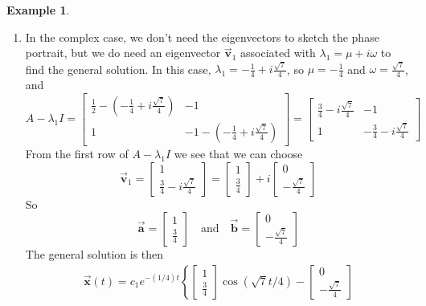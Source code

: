 \documentclass[reqno]{immbook}
\newcommand{\BA}{\vec{\textbf{a}}}
\newcommand{\BB}{\vec{\textbf{b}}}
\newcommand{\BV}{\vec{\textbf{v}}}
\newcommand{\BX}{\vec{\textbf{x}}}
\numberwithin{equation}{chapter}
\numberwithin{question}{section}
\numberwithin{theorem}{chapter}
\numberwithin{figure}{chapter}
\theoremstyle{definition}
\newtheorem{example}{Example}[section]
\begin{document}
\begin{example}
\begin{enumerate}
\item In the complex case, we don't need the eigenvectors
to sketch the phase portrait, but we do need an eigenvector
$\BV_1$ associated with $\lambda_1 = \mu + i \omega$
to find the general solution.
In this case, $\lambda_1 = -\frac{1}{4}+i\frac{\sqrt{7}}{4}$,
so $\mu = -\frac{1}{4}$ and $\omega = \frac{\sqrt{7}}{4}$,
and
\begin{equation}
A-\lambda_1 I =
  \begin{bmatrix}
     \frac{1}{2} - \left( -\frac{1}{4}+i\frac{\sqrt{7}}{4} \right) & -1 \\
     1 & -1 -\left( -\frac{1}{4}+i\frac{\sqrt{7}}{4} \right)
  \end{bmatrix}
     = 
  \begin{bmatrix}
          \frac{3}{4}-i\frac{\sqrt{7}}{4} & -1 \\
	  1 & -\frac{3}{4}-i\frac{\sqrt{7}}{4}
  \end{bmatrix}
\end{equation}
From the first row of $A-\lambda_1 I$ we see that we can choose
\begin{equation}
  \BV_1 = \begin{bmatrix} 1 \\ \frac{3}{4}-i\frac{\sqrt{7}}{4} \end{bmatrix}
   = \begin{bmatrix} 1 \\ \frac{3}{4} \end{bmatrix}
      + i \begin{bmatrix} 0 \\ -\frac{\sqrt{7}}{4} \end{bmatrix}
\end{equation}
So
\begin{equation}
  \BA = \begin{bmatrix} 1 \\ \frac{3}{4} \end{bmatrix}
  \quad \textrm{and} \quad
  \BB = \begin{bmatrix} 0 \\ -\frac{\sqrt{7}}{4} \end{bmatrix}
\end{equation}
The general solution is then
\begin{multline}
  \BX(t) = c_1 e^{-(1/4)t}
      \left\{\begin{bmatrix} 1 \\ \frac{3}{4} \end{bmatrix} \cos\left( \sqrt{7}t/4\right)
      - \begin{bmatrix} 0 \\ -\frac{\sqrt{7}}{4} \end{bmatrix}

\end{multline}
\end{enumerate}
\end{example}
\end{document}
